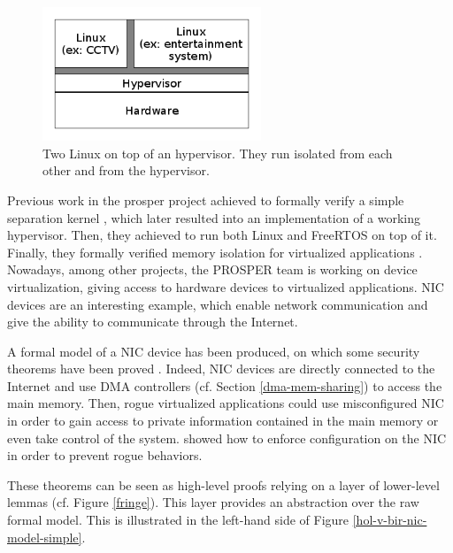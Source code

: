 \documentclass{kththesis}
\begin{document}
\begin{figure}[ht]
	\includegraphics[height=4cm]{figures/figure-hypervisor-simple.png}
	\centering
	\caption{Two Linux on top of an hypervisor. They run isolated from each other and from the hypervisor.}
	\label{figure-hypervisor-simple}
\end{figure}

Previous work in the \acrshort{prosper} project achieved to formally verify a simple separation kernel \cite{noauthor_prosper:_nodate-1,dam_formal_2013}, which later resulted into an implementation of a working hypervisor. Then, they achieved to run both Linux and \gls{FreeRTOS} on top of it. Finally, they formally verified memory isolation for virtualized applications \cite{nemati_trustworthy_2015}. Nowadays, among other projects, the PROSPER team is working on device virtualization, giving access to hardware devices to virtualized applications. \gls{NIC} devices are an interesting example, which enable network communication and give the ability to communicate through the Internet.

A formal model of a \gls{NIC} device has been produced, on which some security theorems have been proved \cite{haglund_formal_2016}.
Indeed, NIC devices are directly connected to the Internet and use \gls{DMA} controllers (cf. Section \ref{dma-mem-sharing}) to access the main memory. Then, rogue virtualized applications could use misconfigured NIC in order to gain access to private information contained in the main memory or even take control of the system. \cite{haglund_formal_2016} showed how to enforce configuration on the NIC in order to prevent rogue behaviors.

These theorems can be seen as high-level proofs relying on a layer of lower-level lemmas (cf. Figure \ref{fringe}). This layer provides an abstraction over the raw formal model. This is illustrated in the left-hand side of Figure \ref{hol-v-bir-nic-model-simple}.
\end{document}
